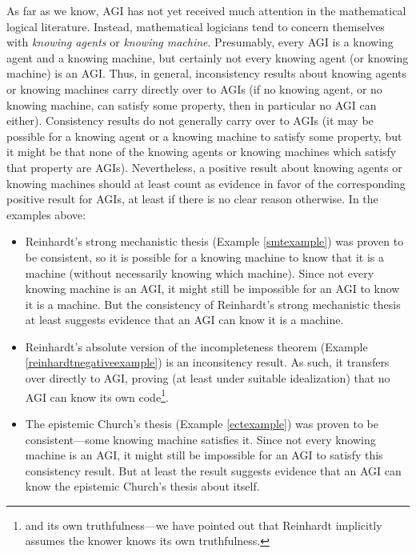 \documentclass[runningheads]{llncs}
\begin{document}
\begin{remark}
  As far as we know, AGI has not yet received much attention in the mathematical logical
  literature. Instead, mathematical logicians tend to concern themselves with
  \emph{knowing agents} or \emph{knowing machine}. Presumably, every AGI is a
  knowing agent and a knowing machine, but certainly not every
  knowing agent (or knowing machine) is an AGI. Thus, in general,
  inconsistency results about knowing agents or knowing machines
  carry directly over to AGIs (if no knowing agent, or no knowing machine, can
  satisfy some property, then in particular no AGI can either).
  Consistency results do not generally carry over to AGIs (it may be possible for
  a knowing agent or a knowing machine to satisfy some property, but it might be
  that none of the knowing agents or knowing machines which satisfy that property
  are AGIs). Nevertheless, a positive result about knowing agents or knowing machines
  should at least count as evidence in favor of the corresponding positive result
  for AGIs, at least if there is no clear reason otherwise. In the examples above:
  \begin{itemize}
    \item
    Reinhardt's strong mechanistic thesis (Example \ref{smtexample})
    was proven to be consistent, so it is possible for a knowing machine to
    know that it is a machine (without necessarily knowing which machine).
    Since not every knowing machine is an AGI, it might still be impossible
    for an AGI to know it is a machine. But the consistency of Reinhardt's
    strong mechanistic thesis at least suggests evidence that an AGI can
    know it is a machine.
    \item
    Reinhardt's absolute version of the incompleteness theorem
    (Example \ref{reinhardtnegativeexample}) is an inconsitency result.
    As such, it transfers over directly to AGI, proving (at least under
    suitable idealization) that no AGI can know its own code\footnote{and its
    own truthfulness---we have pointed out \cite{alexander2014machine} that
    Reinhardt implicitly
    assumes the knower knows its own truthfulness.}.
    \item
    The epistemic Church's thesis (Example \ref{ectexample}) was proven to be
    consistent---some knowing machine satisfies it. Since not every knowing
    machine is an AGI, it might still be impossible for an AGI to satisfy
    this consistency result. But at least the result suggests evidence that
    an AGI can know the epistemic Church's thesis about itself.
  \end{itemize}
\end{remark}
\end{document}
